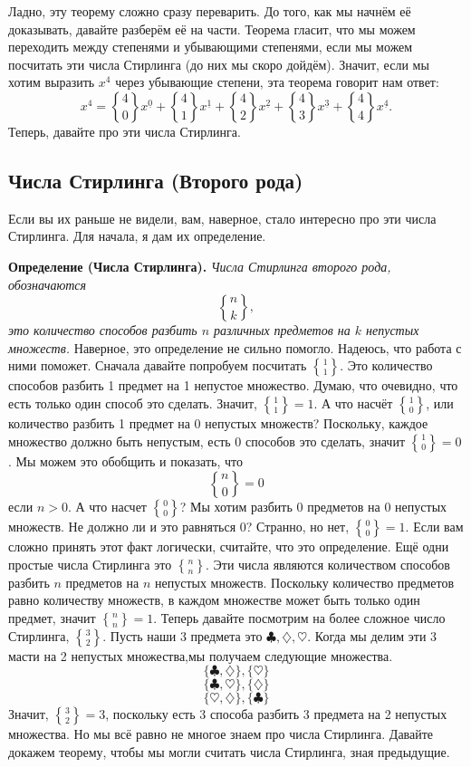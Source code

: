 \documentclass{article}
\newcommand{\ff}[1]{%
  ^{\underline{#1}}%
}
\DeclareRobustCommand{\stirling}{\genfrac\{\}{0pt}{}}
\begin{document}
Ладно, эту теорему сложно сразу переварить. До того, как мы начнём её доказывать, давайте разберём её на части. Теорема гласит, что мы можем переходить между степенями и убывающими степенями, если мы можем посчитать эти числа Стирлинга (до них мы скоро дойдём). Значит, если мы хотим выразить $x^4$ через убывающие степени, эта теорема говорит нам ответ:
$$x^4=\stirling{4}{0}x\ff{0}+\stirling{4}{1}x\ff{1}+\stirling{4}{2}x\ff{2}+\stirling{4}{3}x\ff{3}+\stirling{4}{4}x\ff{4}.$$
Теперь, давайте про эти числа Стирлинга.
\subsection{Числа Стирлинга (Второго рода)}
Если вы их раньше не видели, вам, наверное, стало интересно про эти числа Стирлинга. Для начала, я дам их определение.

\textbf{Определение (Числа Стирлинга).}  \textit{Числа Стирлинга второго рода, обозначаются}
$$\stirling{n}{k},$$
\textit{это количество способов разбить $n$ различных предметов на $k$ непустых множеств.}
Наверное, это определение не сильно помогло. Надеюсь, что работа с ними поможет. Сначала давайте попробуем посчитать $\stirling{1}{1}$. Это количество способов разбить 1 предмет на 1 непустое множество. Думаю, что очевидно, что есть только один способ это сделать. Значит, $\stirling{1}{1}=1$. А что насчёт $\stirling{1}{0}$, или количество разбить 1 предмет на 0 непустых множеств? Поскольку, каждое множество должно быть непустым, есть 0 способов это сделать, значит $\stirling{1}{0}=0$. Мы можем это обобщить и показать, что
$$\stirling{n}{0}=0$$
если $n>0$. А что насчет $\stirling{0}{0}$? Мы хотим разбить 0 предметов на 0 непустых множеств. Не должно ли и это равняться 0? Странно, но нет, $\stirling{0}{0}=1$. Если вам сложно принять этот факт логически, считайте, что это определение.
Ещё одни простые числа Стирлинга это $\stirling{n}{n}$. Эти числа являются количеством способов разбить $n$ предметов на $n$ непустых множеств. Поскольку количество предметов равно количеству множеств, в каждом множестве может быть только один предмет, значит $\stirling{n}{n}=1$.
Теперь давайте посмотрим на более сложное число Стирлинга, $\stirling{3}{2}$. Пусть наши 3 предмета это $\clubsuit,\diamondsuit,\heartsuit$. Когда мы делим эти 3 масти на 2 непустых множества,мы получаем следующие множества.
$$\{\clubsuit,\diamondsuit\},\{\heartsuit\}$$ 
$$\{\clubsuit,\heartsuit\},\{\diamondsuit\}$$
$$\{\heartsuit,\diamondsuit\},\{\clubsuit\}$$
Значит, $\stirling{3}{2}=3$, поскольку есть 3 способа разбить 3 предмета на 2 непустых множества.
Но мы всё равно не многое знаем про числа Стирлинга. Давайте докажем теорему, чтобы мы могли считать числа Стирлинга, зная предыдущие.
\end{document}
